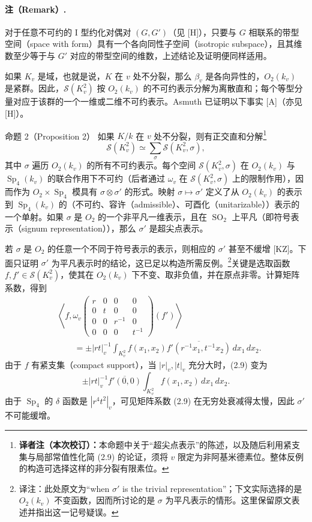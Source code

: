 \paragraph*{注（Remark）.}
对于任意不可约的 I 型约化对偶对 $(G,G')$（见 [H]），只要与 $G$ 相联系的带型空间（space with form）具有一个各向同性子空间（isotropic subspace），且其维数至少等于与 $G'$ 对应的带型空间的维数，上述结论及证明便同样适用。

如果 $K_v$ 是域，也就是说，$K$ 在 $v$ 处不分裂，那么 $\beta_v$ 是各向异性的，$O_2(k_v)$ 是紧群。因此，$\mathcal S(K_v^2)$ 按 $O_2(k_v)$ 的不可约表示分解为离散直和；每个等型分量对应于该群的一个一维或二维不可约表示。Asmuth 已证明以下事实 [A]（亦见 [H]）。

\begin{originaltheorem}{命题 2（Proposition 2）}
如果 $K/k$ 在 $v$ 处不分裂，则有正交直和分解\footnote{\textbf{译者注（本次校订）：}本命题中关于“超尖点表示”的陈述，以及随后利用紧支集与局部常值性化简 (2.9) 的论证，须将 $v$ 限定为非阿基米德素位。整体反例的构造可选择这样的非分裂有限素位。}
\[
 \mathcal S(K_v^2)\simeq\sum_\sigma\mathcal S(K_v^2,\sigma),
\]
其中 $\sigma$ 遍历 $O_2(k_v)$ 的所有不可约表示。每个空间 $\mathcal S(K_v^2,\sigma)$ 在 $O_2(k_v)$ 与 $\operatorname{Sp}_4(k_v)$ 的联合作用下不可约（后者通过 $\omega_v$ 在 $\mathcal S(K_v^2,\sigma)$ 上的限制作用），因而作为 $O_2\times\operatorname{Sp}_4$ 模具有 $\sigma\otimes\sigma'$ 的形式。映射 $\sigma\mapsto\sigma'$ 定义了从 $O_2(k_v)$ 的表示到 $\operatorname{Sp}_4(k_v)$ 的（不可约、容许（admissible）、可酉化（unitarizable））表示的一个单射。如果 $\sigma$ 是 $O_2$ 的一个非平凡一维表示，且在 $\operatorname{SO}_2$ 上平凡（即符号表示（signum representation）），那么 $\sigma'$ 是超尖点表示。
\end{originaltheorem}

若 $\sigma$ 是 $O_2$ 的任意一个不同于符号表示的表示，则相应的 $\sigma'$ 甚至不缓增 [KZ]。下面只证明 $\sigma'$ 为平凡表示时的结论，这已足以构造所需反例。\footnote{译注：此处原文为“when $\sigma'$ is the trivial representation”；下文实际选择的是 $O_2(k_v)$ 不变函数，因而所讨论的是 $\sigma$ 为平凡表示的情形。这里保留原文表述并指出这一记号疑误。}关键是选取函数 $f,f'\in\mathcal S(K_v^2)$，使其在 $O_2(k_v)$ 下不变、取非负值，并在原点非零。计算矩阵系数，得到
\begin{equation}
\begin{split}
 &\left\langle f,\omega_v\!\begin{pmatrix}
 r&0&0&0\\0&t&0&0\\0&0&r^{-1}&0\\0&0&0&t^{-1}
 \end{pmatrix}(f')\right\rangle\\
 &\qquad=\pm|rt|_v^{-1}\int_{K_v^2}
 f(x_1,x_2)\overline{f'(r^{-1}x_1,t^{-1}x_2)}\,dx_1\,dx_2.
\end{split}\tag{2.9}
\end{equation}
由于 $f$ 有紧支集（compact support），当 $|r|_v,|t|_v$ 充分大时，(2.9) 变为
\[
 \pm|rt|_v^{-1}\overline{f'(0,0)}
 \int_{K_v^2}f(x_1,x_2)\,dx_1\,dx_2.
\]
由于 $\operatorname{Sp}_4$ 的 $\delta$ 函数是 $|r^4t^2|_v$，可见矩阵系数 (2.9) 在无穷处衰减得太慢，因此 $\sigma'$ 不可能缓增。

